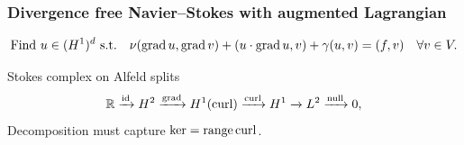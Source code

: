 \documentclass[presentation,aspectratio=43, 10pt]{beamer}
\DeclareMathOperator{\grad}{grad}
\let\div\relax
\DeclareMathOperator{\div}{div}
\DeclareMathOperator{\curl}{curl}
\DeclareMathOperator{\range}{range}
\begin{document}
\begin{frame}[fragile,t]
  \frametitle{Divergence free Navier--Stokes with augmented Lagrangian}
  \vspace{-1.5\baselineskip}
  {\small\begin{equation*}
    \text{Find $u \in (H^1)^d$ s.t.}\quad \nu(\grad u, \grad v) + (u\cdot \grad u, v) + \gamma(\div u, \div v) = (f, v) \quad \forall v \in V.
  \end{equation*}}
  \vspace*{-\baselineskip}
  \begin{block}{Stokes complex on Alfeld splits}
    \begin{equation*}
      \mathbb{R} \xrightarrow{\operatorname{id}} H^2 \xrightarrow{\grad} H^1(\curl)
      \xrightarrow{\curl} H^1 \xrightarrow{\div} L^2 \xrightarrow{\operatorname{null}} 0,
    \end{equation*}
    Decomposition must capture $\ker \div = \range \curl$.


\end{block}
\end{frame}
\end{document}
